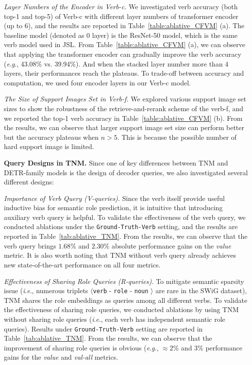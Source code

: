\documentclass[letterpaper]{article} \usepackage{aaai22}  \usepackage{times}  \usepackage{helvet}  \usepackage{courier}  \usepackage[hyphens]{url}  \usepackage{graphicx} \urlstyle{rm} \def\UrlFont{\rm}  \usepackage{natbib}  \usepackage{caption} \DeclareCaptionStyle{ruled}{labelfont=normalfont,labelsep=colon,strut=off} \frenchspacing  \setlength{\pdfpagewidth}{8.5in}  \setlength{\pdfpageheight}{11in}
\newcommand{\ie}{\textit{i}.\textit{e}.}
\newcommand{\eg}{\textit{e}.\textit{g}.}
\begin{document}
\noindent\emph{Layer Numbers of the Encoder in Verb-c.} We investigated verb accuracy (both top-1 and top-5) of Verb-c with different layer numbers of transformer encoder (up to 6), and the results are reported in Table~\ref{table:ablative_CFVM} (a). The baseline model (denoted as 0 layer) is the ResNet-50 model, which is the same verb model used in JSL. From Table~\ref{table:ablative_CFVM} (a), we can observe that applying the transformer encoder can gradually improve the verb accuracy (\eg, 43.08\% vs. 39.94\%). And when the stacked layer number more than 4 layers, their performances reach the plateaus. To trade-off between accuracy and computation, we used four encoder layers in our Verb-c model.






\noindent\emph{The Size of Support Images Set in Verb-f.}
We explored various support image set sizes to show the robustness of the retrieve-and-rerank scheme of the verb-f, and we reported the top-1 verb accuracy in Table~\ref{table:ablative_CFVM} (b). From the results, we can observe that larger support image set size can perform better but the accuracy plateaus when $n > 5$. 
This is because the possible number of hard support image is limited. 


\noindent\textbf{Query Designs in TNM.} Since one of key differences between TNM and DETR-family models is the design of decoder queries, we also investigated several different designs:

\noindent\emph{Importance of Verb Query (V-queries).} Since the verb itself provide useful inductive bias for semantic role prediction, it is intuitive that introducing auxiliary verb query is helpful. To validate the effectiveness of the verb query, we conducted ablations under the \texttt{Ground-Truth-Verb} setting, and the results are reported in Table~\ref{tab:ablative_TNM}. From the results, we can observe that the verb query brings $1.68\%$ and $2.30\%$ absolute performance gains on the \emph{value} metric. It is also worth noting that TNM without verb query already achieves new state-of-the-art performance on all four metrics.



\noindent\emph{Effectiveness of Sharing Role Queries (R-queries).} To mitigate semantic sparsity issue (\ie, numerous triplets $\langle$\texttt{verb} - \texttt{role} - \texttt{noun} $\rangle$ are rare in the SWiG dataset), TNM shares the role embeddings as queries among all different verbs. To validate the effectiveness of sharing role queries, we conducted ablations by using TNM without sharing role queries (\ie, each verb has independent semantic role queries). Results under \texttt{Ground-Truth-Verb} setting are reported in Table~\ref{tab:ablative_TNM}. From the results, we can observe that the improvement of sharing role queries is obvious (\eg, $\approx 2\%$ and  $3\%$ performance gains for the \emph{value} and \emph{val-all} metrics.
\end{document}
